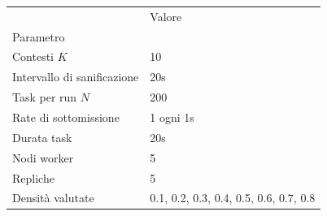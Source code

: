 \begin{tabular}{ll}
\toprule
 & Valore \\
Parametro &  \\
\midrule
Contesti $K$ & 10 \\
Intervallo di sanificazione & 20s \\
Task per run $N$ & 200 \\
Rate di sottomissione & 1 ogni 1s \\
Durata task & 20s \\
Nodi worker & 5 \\
Repliche & 5 \\
Densità valutate & 0.1, 0.2, 0.3, 0.4, 0.5, 0.6, 0.7, 0.8 \\
\bottomrule
\end{tabular}
